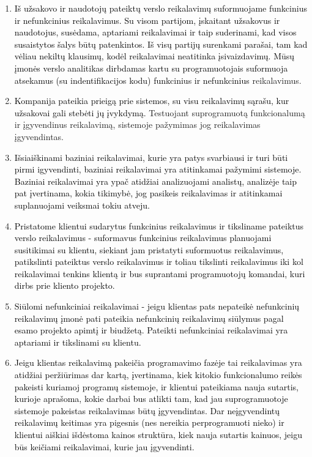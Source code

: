 \documentclass{VUMIFPSkursinis}
\begin{document}
	\begin{enumerate}
		\item{
			\textcolor{black}{Iš užsakovo ir naudotojų pateiktų verslo reikalavimų suformuojame funkcinius ir nefunkcinius reikalavimus.
			Su visom partijom, įskaitant užsakovus ir naudotojus, susėdama, aptariami reikalavimai ir taip suderinami, kad visos susaistytos šalys būtų patenkintos.
			Iš visų partijų surenkami parašai, tam kad vėliau nekiltų klausimų, kodėl reikalavimai neatitinka įsivaizdavimų.
			Mūsų įmonės verslo analitikas dirbdamas kartu su programuotojais suformuoja atsekamus (su indentifikacijos kodu) funkcinius ir nefunkcinius} reikalavimus.
		}
		\item{
			\textcolor{black}{Kompanija pateikia prieigą prie sistemos, su visu reikalavimų sąrašu, kur užsakovai gali stebėti jų įvykdymą.}
			Testuojant suprogramuotą funkcionalumą ir įgyvendinus reikalavimą, sistemoje pažymimas jog reikalavimas įgyvendintas.
		}
		\item{
			\textcolor{black}{Išsiaiškinami baziniai reikalavimai, kurie yra patys svarbiausi ir turi būti pirmi igyvendinti, baziniai reikalavimai yra atitinkamai pažymimi sistemoje.
			Baziniai reikalavimai yra ypač atidžiai analizuojami analistų, analizėje taip pat įvertinama, kokia tikimybė, jog pasikeis reikalavimas ir atitinkamai suplanuojami veiksmai tokiu atveju.}
		}
		\item{
				\textcolor{black}{Pristatome klientui sudarytus funkcinius reikalavimus ir tiksliname pateiktus verslo reikalavimus - suformavus funkcinius reikalavimus planuojami susitikimai su klientu, siekiant jam pristatyti suformuotus reikalavimus, patikslinti pateiktus verslo reikalavimus ir toliau tikslinti reikalavimus iki kol reikalavimai tenkins klientą ir bus suprantami programuotojų komandai, kuri dirbs prie kliento projekto.}
		}
		\item{
			\textcolor{black}{Siūlomi nefunkciniai reikalavimai - jeigu klientas pats nepateikė nefunkcinių reikalavimų įmonė pati pateikia nefunkcinių reikalavimų siūlymus pagal esamo projekto apimtį ir biudžetą.
			Pateikti nefunkciniai reikalavimai yra aptariami ir tikslinami su klientu.}
		}
		\item{
			\textcolor{black}{Jeigu klientas reikalavimą pakeičia programavimo fazėje tai reikalavimas yra atidžiai peržiūrimas dar kartą, įvertinama, kiek kitokio funkcionalumo reikės pakeisti kuriamoj programų sistemoje, ir klientui pateikiama nauja sutartis, kurioje aprašoma, kokie darbai bus atlikti tam, kad jau suprogramuotoje sistemoje pakeistas reikalavimas būtų įgyvendintas.
			Dar neįgyvendintų reikalavimų keitimas yra pigesnis (nes nereikia perprogramuoti nieko) ir klientui aiškiai išdėstoma kainos struktūra, kiek nauja sutartis kainuos, jeigu būs keičiami reikalavimai, kurie jau įgyvendinti.}
		}
	\end{enumerate}
\end{document}
